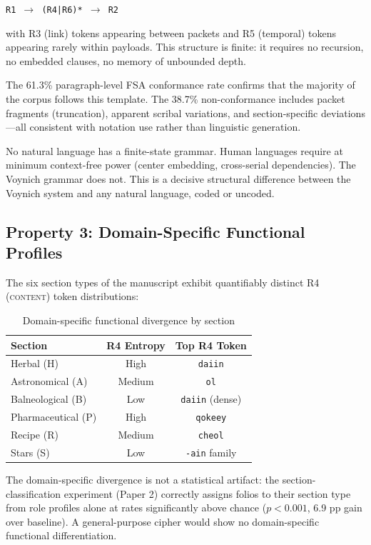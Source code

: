 \documentclass[11pt,a4paper,twocolumn]{article}
\begin{document}
\begin{center}
\texttt{R1 $\to$ (R4|R6)* $\to$ R2}
\end{center}

\noindent with R3 (link) tokens appearing between packets and R5 (temporal) tokens appearing rarely within payloads. This structure is finite: it requires no recursion, no embedded clauses, no memory of unbounded depth.

The 61.3\% paragraph-level FSA conformance rate confirms that the majority of the corpus follows this template. The 38.7\% non-conformance includes packet fragments (truncation), apparent scribal variations, and section-specific deviations---all consistent with notation use rather than linguistic generation.

No natural language has a finite-state grammar. Human languages require at minimum context-free power (center embedding, cross-serial dependencies). The Voynich grammar does not. This is a decisive structural difference between the Voynich system and any natural language, coded or uncoded.

\subsection{Property 3: Domain-Specific Functional Profiles}

The six section types of the manuscript exhibit quantifiably distinct R4 (\textsc{content}) token distributions:

\begin{table}[H]
\centering
\caption{Domain-specific functional divergence by section}
\label{tab:domain}
\small
\begin{tabular}{@{}lcc@{}}
\toprule
\textbf{Section} & \textbf{R4 Entropy} & \textbf{Top R4 Token} \\
\midrule
Herbal (H) & High & \texttt{daiin} \\
Astronomical (A) & Medium & \texttt{ol} \\
Balneological (B) & Low & \texttt{daiin} (dense) \\
Pharmaceutical (P) & High & \texttt{qokeey} \\
Recipe (R) & Medium & \texttt{cheol} \\
Stars (S) & Low & \texttt{-ain} family \\
\bottomrule
\end{tabular}
\end{table}

\noindent The domain-specific divergence is not a statistical artifact: the section-classification experiment (Paper 2) correctly assigns folios to their section type from role profiles alone at rates significantly above chance ($p < 0.001$, 6.9 pp gain over baseline). A general-purpose cipher would show no domain-specific functional differentiation.
\end{document}
